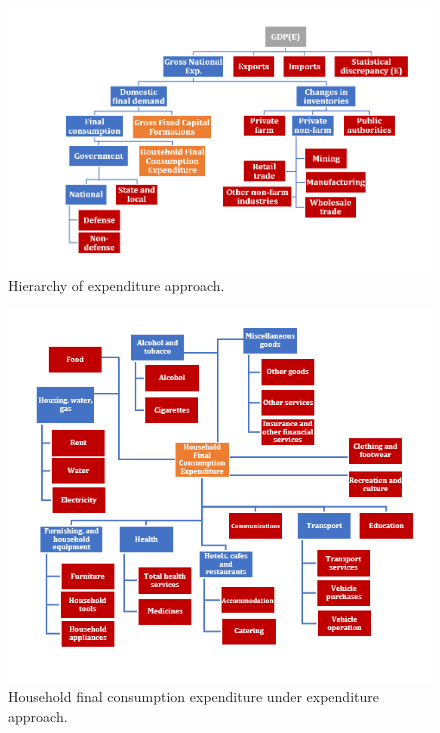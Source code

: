 \documentclass[graybox]{svmult}
\begin{document}
\begin{figure}[H]
	\centering
	\small
	\includegraphics[scale=0.65]{Figs/GDP_E_fig1.PNG}
	\caption{Hierarchy of expenditure approach.}\label{GDP_E_fig1}
\end{figure}

\begin{figure}[H]
	\centering
	\small
	\includegraphics[scale=1]{Figs/GDP_E_fig2.PNG}
	\caption{Household final consumption expenditure under expenditure approach.}\label{GDP_E_fig2}
\end{figure}
\end{document}
